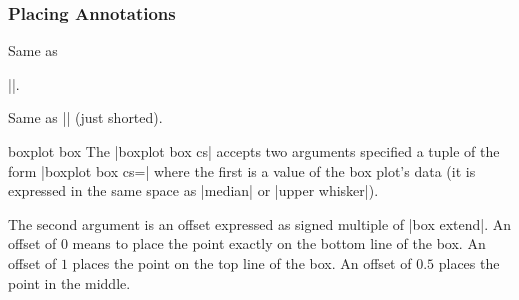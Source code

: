 \subsubsection{Placing Annotations}

\begin{command}{\pgfplotsboxplotvalue{}}
    Same as

    ||.
\end{command}

\begin{command}{\boxplotvalue{}}
    Same as |\pgfplotsboxplotvalue| (just shorted).
\end{command}

\begin{coordinatesystem}{boxplot box}%
   The |boxplot box cs| accepts two arguments specified a tuple of the form
   |boxplot box cs=| where the first
   is a value of the box plot's data (it is expressed in the same space as
   |median| or |upper whisker|).

    The second argument is an offset expressed as signed multiple of
    |box extend|. An offset of $0$ means to place the point exactly on the
    bottom line of the box. An offset of $1$ places the point on the top line
    of the box. An offset of $0.5$ places the point in the middle.
\begin{codeexample}[]
\end{codeexample}
\end{coordinatesystem}


